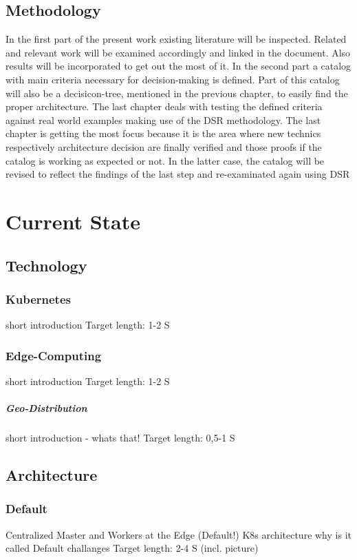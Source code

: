 \documentclass[MSC,Master,english]{twbook}%
\begin{document}
\section{Methodology}
In the first part of the present work existing literature will be inspected. Related and relevant work will be examined accordingly and linked in the document. Also results will be incorporated to get out the most of it. In the second part a catalog with main criteria necessary for decision-making is defined. Part of this catalog will also be a decisicon-tree, mentioned in the previous chapter, to easily find the proper architecture. The last chapter deals with testing the defined criteria against real world examples making use of the \ac{DSR} methodology. The last chapter is getting the most focus because it is the area where new technics respectively architecture decision are finally verified and those proofs if the catalog is working as expected or not. In the latter case, the catalog will be revised to reflect the findings of the last step and re-examinated again using \ac{DSR}

\chapter{Current State}
\label{chap:current}

\section{Technology}
\subsection{Kubernetes}
short introduction
Target length: 1-2 S
\subsection{Edge-Computing}
short introduction
Target length: 1-2 S
\paragraph{Geo-Distribution}
short introduction - whats that!
Target length: 0,5-1 S

\section{Architecture}
\subsection{Default}
Centralized Master and Workers at the Edge (Default!) K8s architecture
why is it called Default
challanges
Target length: 2-4 S (incl. picture)
\end{document}
